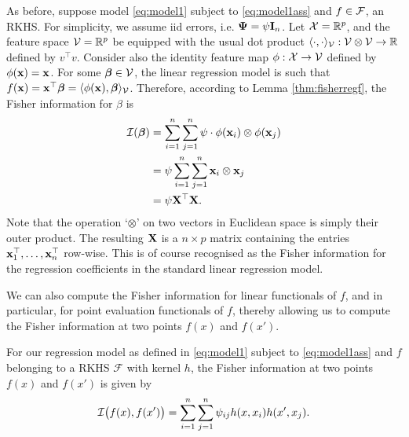 \begin{example}
  As before, suppose model \cref{eq:model1} subject to \cref{eq:model1ass} and $f\in{\mathcal F}$, an RKHS.
  For simplicity, we assume iid errors, i.e. ${\bm\Psi} = \psi {\mathbf I}_n$.
  Let ${\mathcal X} = \mathbb{R}^p$, and the feature space ${\mathcal V} = \mathbb{R}^p$ be equipped with the usual dot product $\langle\cdot,\cdot\rangle_{\mathcal V}:{\mathcal V} \otimes {\mathcal V} \to \mathbb{R}$ defined by $v^\top v$.
  Consider also the identity feature map $\phi:{\mathcal X} \to {\mathcal V}$ defined by $\phi({\mathbf x})={\mathbf x}$.
  For some $\boldsymbol\beta \in {\mathcal V}$, the linear regression model is such that $f({\mathbf x}) = {\mathbf x}^\top \boldsymbol\beta = \langle\phi({\mathbf x}),\boldsymbol\beta\rangle_{\mathcal V}$.
  Therefore, according to Lemma \cref{thm:fisherregf}, the Fisher information for $\beta$ is
  \begin{align*}
    {\mathcal I}(\boldsymbol\beta) 
    &= \sum_{i=1}^n\sum_{j=1}^n \psi \cdot \phi({\mathbf x}_i) \otimes \phi({\mathbf x}_j) \\
    &= \psi \sum_{i=1}^n\sum_{j=1}^n {\mathbf x}_i \otimes {\mathbf x}_j \\
    &= \psi {\mathbf X}^\top {\mathbf X}.
  \end{align*}
  Note that the operation `$\otimes$' on two vectors in Euclidean space is simply their outer product.
  The resulting ${\mathbf X}$ is a $n \times p$ matrix containing the entries ${\mathbf x}_1^\top,\dots,{\mathbf x}_n^\top$ row-wise.
  This is of course recognised as the Fisher information for the regression coefficients in the standard linear regression model.
\end{example}

We can also compute the Fisher information for linear functionals of $f$, and in particular, for point evaluation functionals of $f$, thereby allowing us to compute the Fisher information at two points $f(x)$ and $f(x')$.

\begin{corollary}\label{thm:fisherreglinfunc}
	For \hspace{0.5pt} our \hspace{0.5pt} regression model as defined in \cref{eq:model1} subject to \cref{eq:model1ass} and $f$ belonging to a RKHS $\mathcal F$ with kernel $h$, the Fisher information at two points $f(x)$ and $f(x')$
	is given by
	\[
		{\mathcal I}\big(f(x),f(x')\big) = \sum_{i=1}^n\sum_{j=1}^n \psi_{ij} h(x,x_i)h(x',x_j).
	\]
\end{corollary}

